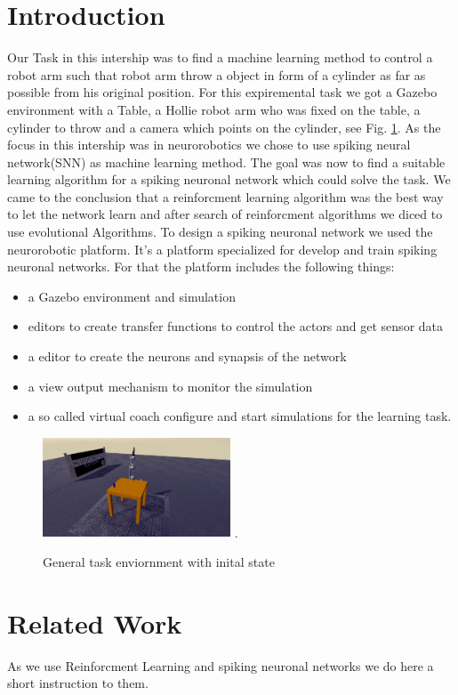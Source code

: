 \section{Introduction}
Our Task in this intership was to find a machine learning method to control a robot arm such that robot arm throw a object in form of a cylinder as far as possible from his original position. For this expiremental task we got a Gazebo environment with a Table, a Hollie robot arm who was fixed on the table, a cylinder to throw and a camera which points on the cylinder, see Fig. \ref{init_state}.
As the focus in this intership was in neurorobotics we chose to use spiking neural network(SNN) as machine learning method. The goal was now to find a suitable learning algorithm for a spiking neuronal network which could solve the task. We came to the conclusion that a reinforcment learning algorithm was the best way to let the network learn and after search of reinforcment algorithms we diced to use evolutional Algorithms. 
To design a spiking neuronal network we used the neurorobotic platform. It's a platform specialized for develop and train spiking neuronal networks. For that the platform includes the following things:
 \begin{itemize}
\item a Gazebo environment and simulation
\item editors to create transfer functions to control the actors and get sensor data
\item a editor to create the neurons and synapsis of the network
\item a view output mechanism to monitor the simulation
\item a so called virtual coach configure and start simulations for the learning task.
\end{itemize} 
\begin{figure}[H]
	\centering
	\includegraphics[width=2.2in]{img/init_state.png}
	\DeclareGraphicsExtensions.
	\caption{General task enviornment with inital state }
	\label{init_state}
\end{figure}
\section{Related Work}
As we use Reinforcment Learning and spiking neuronal networks we do here a short instruction to them.

